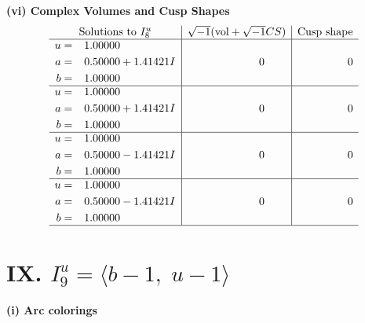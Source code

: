\documentclass[1p]{elsarticle_modified}
\theoremstyle{definition}
\newcommand{\I}{\sqrt{-1}}
\begin{document}
\newpage\flushleft \textbf{(vi) Complex Volumes and Cusp Shapes}
$$\begin{array}{c|c|c}  
\text{Solutions to }I^u_{8}& \I (\text{vol} + \sqrt{-1}CS) & \text{Cusp shape}\\
 \hline 
\begin{aligned}
u &= \phantom{-}1.00000\phantom{ +0.000000I} \\
a &= \phantom{-}0.50000 + 1.41421 I \\
b &= \phantom{-}1.00000\phantom{ +0.000000I}\end{aligned}
 & \phantom{-0.000000 } 0 & \phantom{-0.000000 } 0 \\ \hline\begin{aligned}
u &= \phantom{-}1.00000\phantom{ +0.000000I} \\
a &= \phantom{-}0.50000 + 1.41421 I \\
b &= \phantom{-}1.00000\phantom{ +0.000000I}\end{aligned}
 & \phantom{-0.000000 } 0 & \phantom{-0.000000 } 0 \\ \hline\begin{aligned}
u &= \phantom{-}1.00000\phantom{ +0.000000I} \\
a &= \phantom{-}0.50000 - 1.41421 I \\
b &= \phantom{-}1.00000\phantom{ +0.000000I}\end{aligned}
 & \phantom{-0.000000 } 0 & \phantom{-0.000000 } 0 \\ \hline\begin{aligned}
u &= \phantom{-}1.00000\phantom{ +0.000000I} \\
a &= \phantom{-}0.50000 - 1.41421 I \\
b &= \phantom{-}1.00000\phantom{ +0.000000I}\end{aligned}
 & \phantom{-0.000000 } 0 & \phantom{-0.000000 } 0\\
 \hline 
 \end{array}$$\newpage\newpage\renewcommand{\arraystretch}{1}
\centering \section*{IX. $I^u_{9}= \langle b-1,\;u-1 \rangle$}
\flushleft \textbf{(i) Arc colorings}\\
\end{document}
